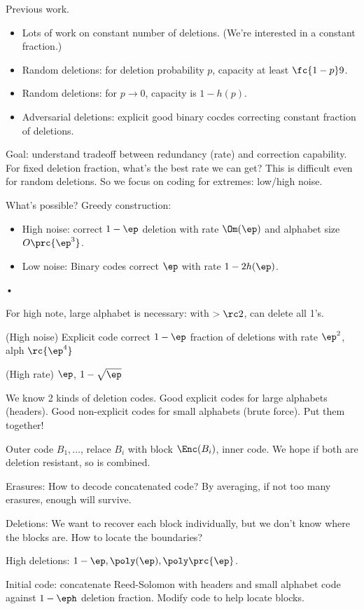 Previous work.
\begin{itemize}
\item
Lots of work on constant number of deletions. (We're interested in a constant fraction.)
\item
Random deletions: for deletion probability $p$, capacity at least $\fc{1-p}9$.
\item
Random deletions: for $p\to 0$, capacity is $1-h(p)$.
\item
Adversarial deletions: explicit good binary cocdes correcting constant fraction of deletions.
\end{itemize}

Goal: understand tradeoff between redundancy (rate) and correction capability. For fixed deletion fraction, what's the best rate we can get? This is difficult even for random deletions. So we focus on coding for extremes: low/high noise.

What's possible? Greedy construction:
\begin{itemize}
\item
High noise: correct $1-\ep$ deletion with rate $\Om(\ep)$ and alphabet size $O\prc{\ep^3}$.
\item
Low noise: Binary codes correct $\ep$ with rate $1-2h(\ep)$.
\end{itemize}•

For high note, large alphabet is necessary: with $>\rc2$, can delete all 1's.

\begin{thm}
(High noise) Explicit code correct $1-\ep$ fraction of deletions with rate $\ep^2$, alph $\rc{\ep^4}$

(High rate) $\ep$, $1-\sqrt{\ep}$
\end{thm}

We know 2 kinds of deletion codes. Good explicit codes for large alphabets (headers). Good non-explicit codes for small alphabets (brute force). Put them together!

Outer code $B_1,\ldots$, relace $B_i$ with block $\Enc(B_i)$, inner code. We hope if both are deletion resistant, so is combined.

Erasures: How to decode concatenated code? By averaging, if not too many erasures, enough will survive. 

Deletions: We want to recover each block individually, but we don't know where the blocks are. How to locate the boundaries?

High deletions:
$1-\ep,\poly(\ep),\poly\prc{\ep}$.

Initial code: concatenate Reed-Solomon with headers and small alphabet code against $1-\eph$ deletion fraction. Modify code to help locate blocks.

